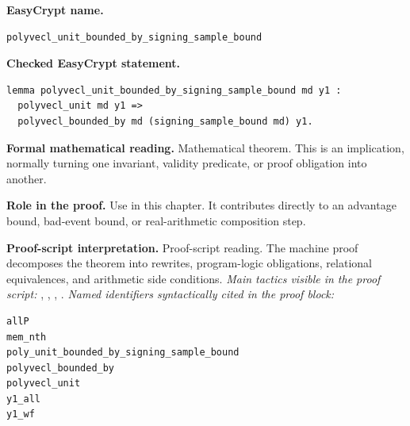 \begin{formaltheorem}
\noindent\textbf{EasyCrypt name.}
\begin{lstlisting}[language=EasyCrypt,basicstyle=\ttfamily\scriptsize]
polyvecl_unit_bounded_by_signing_sample_bound
\end{lstlisting}
\noindent\textbf{Checked EasyCrypt statement.}
\begin{lstlisting}[language=EasyCrypt,basicstyle=\ttfamily\scriptsize]
lemma polyvecl_unit_bounded_by_signing_sample_bound md y1 :
  polyvecl_unit md y1 =>
  polyvecl_bounded_by md (signing_sample_bound md) y1.
\end{lstlisting}
\noindent\textbf{Formal mathematical reading.}
Mathematical theorem. This is an implication, normally turning one invariant, validity predicate, or proof obligation into another.

\noindent\textbf{Role in the proof.}
Use in this chapter. It contributes directly to an advantage bound, bad-event bound, or real-arithmetic composition step.

\noindent\textbf{Proof-script interpretation.}
Proof-script reading. The machine proof decomposes the theorem into rewrites, program-logic obligations, relational equivalences, and arithmetic side conditions.
\emph{Main tactics visible in the proof script:} , , , .
\emph{Named identifiers syntactically cited in the proof block:}
\begin{lstlisting}[language=EasyCrypt,basicstyle=\ttfamily\scriptsize]
allP
mem_nth
poly_unit_bounded_by_signing_sample_bound
polyvecl_bounded_by
polyvecl_unit
y1_all
y1_wf
\end{lstlisting}

\end{formaltheorem}

